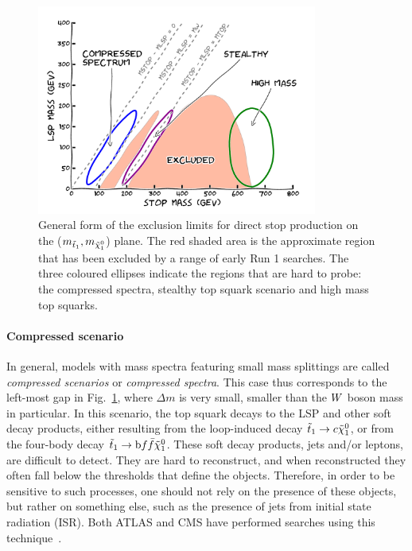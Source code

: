 \begin{figure}[tpb]
  \centering
  \includegraphics[width=0.82\textwidth]{figures/razor_motivation/story_boost_motivation}
  \caption{General form of the exclusion limits for direct stop production on the
($m_{\tilde{t}_1},m_{\tilde{\chi}_1^0}$) plane. The red shaded area is the approximate region that has been
excluded by a range of early Run 1 searches. The three coloured ellipses indicate the regions that
are hard to probe: the compressed spectra, stealthy top squark scenario and high mass top squarks.
  \label{fig:boost_story_motivation}}
\end{figure}

\paragraph{Compressed scenario}
In general, models with mass spectra featuring small mass splittings are called \textit{compressed
scenarios} or \textit{compressed spectra}. This case thus corresponds to the left-most gap in
Fig.~\ref{fig:boost_story_motivation}, where $\Delta m$ is very small, smaller than the $W$ boson
mass in particular. 
In this scenario, the top squark decays to the LSP and other soft decay products, either resulting
from the loop-induced decay $\tilde{t}_1 \rightarrow c \tilde{\chi}_1^0$, or from the four-body decay $\tilde{t}_1
\rightarrow \mathrm{b} f \bar{f} \tilde{\chi}_1^0$. These soft decay products, jets and/or leptons, are difficult to
detect. They are hard to reconstruct, and when reconstructed they often fall below the \pt
thresholds that define the objects. 
Therefore, in order to be sensitive to such processes, one should not rely on the presence of
these objects, but rather on something else, such as the presence of jets from initial state
radiation (ISR). Both ATLAS and CMS have performed searches using this
technique~\cite{CMS-PAS-SUS-13-009,Aad:2014nra}. 

